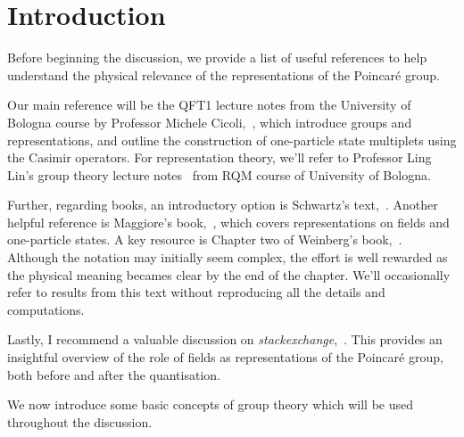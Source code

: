 \section{Introduction}
Before beginning the discussion, we provide a list of useful references to help understand the physical relevance of the representations of the Poincaré group. 

Our main reference will be the QFT1 lecture notes from the University of Bologna course by Professor Michele Cicoli,~\cite{cicoli}, which introduce groups and representations, and outline the construction of one-particle state multiplets using the Casimir operators. For representation theory, we'll refer to Professor Ling Lin's group theory lecture notes~\cite{ling} from RQM course of University of Bologna.

Further, regarding books, an introductory option is Schwartz's text,~\cite{schwartz}. Another helpful reference is Maggiore's book,~\cite{maggiore}, which covers representations on fields and one-particle states. A key resource is Chapter two of Weinberg's book,~\cite{weinberg}. Although the notation may initially seem complex, the effort is well rewarded as the physical meaning becames clear by the end of the chapter. We'll occasionally refer to results from this text without reproducing all the details and computations.

Lastly, I recommend a valuable discussion on \emph{stackexchange},~\cite{stackexchange}. This provides an insightful overview of the role of fields as representations of the Poincaré group, both before and after the quantisation.

We now introduce some basic concepts of group theory which will be used throughout the discussion.
